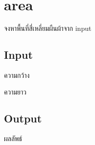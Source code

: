 \documentclass{article}
\begin{document}
\section*{area}

จงหาพื้นที่สี่เหลี่ยมผืนผ้าจาก input\\



\subsection*{Input}
ความกว้าง



ความยาว



\subsection*{Output}
{ผลลัพธ์}\\
\end{document}
